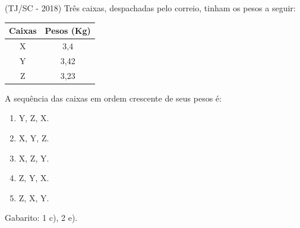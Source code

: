 \begin{exer}
(TJ/SC - 2018) Três caixas, despachadas pelo correio, tinham os pesos a seguir:
 \begin{table}[H]
 \centering
 \begin{tabular}{|c|c|} \hline
 \rowcolor{cinza}
 Caixas & Pesos (Kg) \\ \hline
 X & 3,4 \\ \hline
 Y & 3,42 \\ \hline
 Z & 3,23 \\ \hline
 \end{tabular}
 \end{table}
 A sequência das caixas em ordem crescente de seus pesos é:
  \begin{enumerate}
  \item Y, Z, X.
  \item X, Y, Z.
  \item X, Z, Y.
  \item Z, Y, X.
  \item Z, X, Y.
 \end{enumerate}
\end{exer}

Gabarito: 1 c), 2 e).
